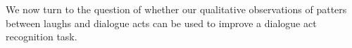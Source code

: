 \documentclass[11pt,a4paper]{article}
\begin{document}
\begin{lingex}
\item\label{ex:sorry}
  \small
\end{lingex}

We now turn to the question of whether our qualitative observations of patters between laughs and dialogue acts can be used to improve a dialogue act recognition task.













\end{document}
